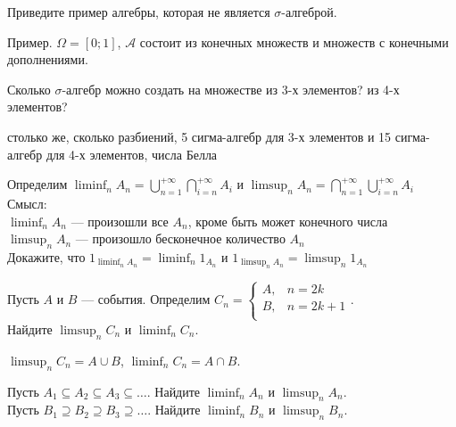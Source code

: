 \begin{problem}
Приведите пример алгебры, которая не является $\sigma$-алгеброй.
\end{problem} 
\begin{solution} 
Пример. $\Omega=[0;1]$, $\mathcal{A}$ состоит из конечных множеств и множеств с конечными дополнениями.
\end{solution}

\begin{problem}
Сколько $\sigma$-алгебр можно создать на множестве из 3-х элементов? из 4-х элементов? 
\end{problem} 
\begin{solution} 
столько же, сколько разбиений, 5 сигма-алгебр для 3-х элементов и 15 сигма-алгебр для 4-х элементов, числа Белла 
\end{solution}

\begin{problem}
Определим $\liminf_{n}
A_{n}=\bigcup_{n=1}^{+\infty}\bigcap_{i=n}^{+\infty}A_{i}$ и
$\limsup_{n}
A_{n}=\bigcap_{n=1}^{+\infty}\bigcup_{i=n}^{+\infty}A_{i}$ \\
Смысл: \\
$\liminf_{n} A_{n}$ --- произошли все $A_{n}$, кроме быть может
конечного числа \\
$\limsup_{n} A_{n}$ --- произошло бесконечное количество $A_{n}$ \\
Докажите, что $1_{\liminf_{n}A_{n}}=\liminf_{n}1_{A_{n}}$ и
$1_{\limsup_{n}A_{n}}=\limsup_{n}1_{A_{n}}$ 
\end{problem} 
\begin{solution} 

\end{solution}

\begin{problem}
Пусть $A$ и $B$ --- события. Определим $C_{n}=
\begin{cases}
  A, & n=2k \\
  B, & n=2k+1 \\
\end{cases}$. \\
Найдите $\limsup_{n}C_{n}$ и $\liminf_{n}C_{n}$.
\end{problem} 
\begin{solution} 
$\limsup_{n}C_{n}=A\cup B$, $\liminf_{n}C_{n}=A\cap B$. 
\end{solution}

\begin{problem}
Пусть $A_{1} \subseteq A_{2} \subseteq A_{3} \subseteq \ldots$.
Найдите $\liminf_{n}A_{n}$ и $\limsup_{n}A_{n}$. \\
Пусть $B_{1} \supseteq B_{2} \supseteq B_{3} \supseteq \ldots$.
Найдите $\liminf_{n}B_{n}$ и $\limsup_{n}B_{n}$. 

\end{problem} 
\begin{solution} 

\end{solution}

